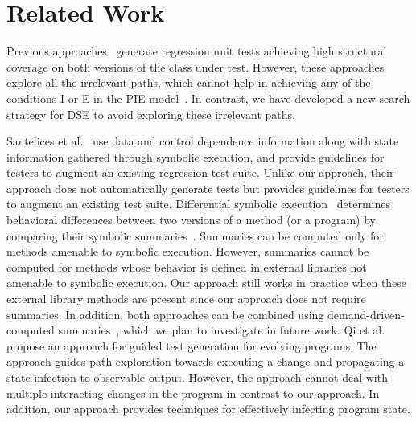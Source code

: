 \vspace{-0.2cm}
\section{Related Work}
\vspace{-0.5cm}
\label{sec:related}
Previous approaches~\cite{evans:DiffTest07,taneja08:diffgen,jin10:automated} generate regression unit tests achieving high structural coverage on both versions of the class under test. However, these approaches explore all the irrelevant paths, which cannot help in achieving any of the conditions I or E in the PIE model~\cite{voas}. In contrast, we have developed a new search strategy for DSE to avoid exploring these irrelevant paths. 


Santelices et al.~\cite{santelices08sep} use data and control dependence information along with state information gathered through symbolic execution, and provide guidelines for testers to augment an existing regression test suite. Unlike our approach, their approach does not automatically generate tests but provides guidelines for testers to augment an existing test suite. 
Differential symbolic execution~\cite{DSE} determines behavioral differences between two versions of a method (or a program) by comparing their symbolic summaries~\cite{CSE}. Summaries can be computed only for methods amenable to symbolic execution. However, summaries cannot be computed for methods whose behavior is defined in external libraries not amenable to symbolic execution. Our approach still works in practice when these external library methods are present since our approach does not require summaries. In addition, both approaches can be combined using demand-driven-computed summaries~\cite{demandDriven}, which we plan to investigate in future work.
Qi et al.~\cite{qi-ase10} propose an approach for guided test generation for evolving programs.
The approach guides path exploration towards executing a change and propagating a state infection to observable output.
However, the approach cannot deal with multiple interacting changes in the program in contrast to our approach.
In addition, our approach provides techniques for effectively infecting program state.

